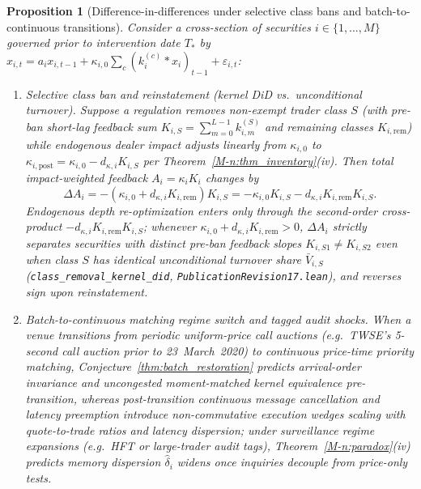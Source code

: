 \documentclass[12pt]{article}
\newtheorem{proposition}[theorem]{Proposition}
\theoremstyle{definition}
\theoremstyle{remark}
\begin{document}
\begin{proposition}[Difference-in-differences under selective class bans and batch-to-continuous transitions]\label{prop:natural_exp}
Consider a cross-section of securities $i \in \{1,\dots,M\}$ governed prior to intervention date $T_*$ by $x_{i,t} = a_i x_{i,t-1} + \kappa_{i,0} \sum_{c} (k_i^{(c)} * x_i)_{t-1} + \varepsilon_{i,t}$:
\begin{enumerate}
  \item[(i)] \emph{Selective class ban and reinstatement (kernel DiD vs.\ unconditional turnover).} Suppose a regulation removes non-exempt trader class $S$ (with pre-ban short-lag feedback sum $K_{i,S} = \sum_{m=0}^{L-1} k_{i,m}^{(S)}$ and remaining classes $K_{i,\mathrm{rem}}$) while endogenous dealer impact adjusts linearly from $\kappa_{i,0}$ to $\kappa_{i,\mathrm{post}} = \kappa_{i,0} - d_{\kappa,i} K_{i,S}$ per Theorem~\ref{M-n:thm_inventory}(iv). Then total impact-weighted feedback $A_i = \kappa_i K_i$ changes by
  \[
    \Delta A_i = -(\kappa_{i,0} + d_{\kappa,i} K_{i,\mathrm{rem}}) K_{i,S} = -\kappa_{i,0} K_{i,S} - d_{\kappa,i} K_{i,\mathrm{rem}} K_{i,S}.
  \]
  Endogenous depth re-optimization enters only through the second-order cross-product $-d_{\kappa,i} K_{i,\mathrm{rem}} K_{i,S}$; whenever $\kappa_{i,0} + d_{\kappa,i} K_{i,\mathrm{rem}} > 0$, $\Delta A_i$ strictly separates securities with distinct pre-ban feedback slopes $K_{i,S1} \neq K_{i,S2}$ even when class $S$ has identical unconditional turnover share $\bar V_{i,S}$ (\texttt{class\_removal\_kernel\_did}, \nolinkurl{PublicationRevision17.lean}), and reverses sign upon reinstatement.
  \item[(ii)] \emph{Batch-to-continuous matching regime switch and tagged audit shocks.} When a venue transitions from periodic uniform-price call auctions (e.g.\ TWSE's 5-second call auction prior to 23~March~2020) to continuous price-time priority matching, Conjecture~\ref{thm:batch_restoration} predicts arrival-order invariance and uncongested moment-matched kernel equivalence pre-transition, whereas post-transition continuous message cancellation and latency preemption introduce non-commutative execution wedges scaling with quote-to-trade ratios and latency dispersion; under surveillance regime expansions (e.g.\ HFT or large-trader audit tags), Theorem~\ref{M-n:paradox}(iv) predicts memory dispersion $\hat\delta_i$ widens once inquiries decouple from price-only tests.
\end{enumerate}
\end{proposition}
\end{document}
